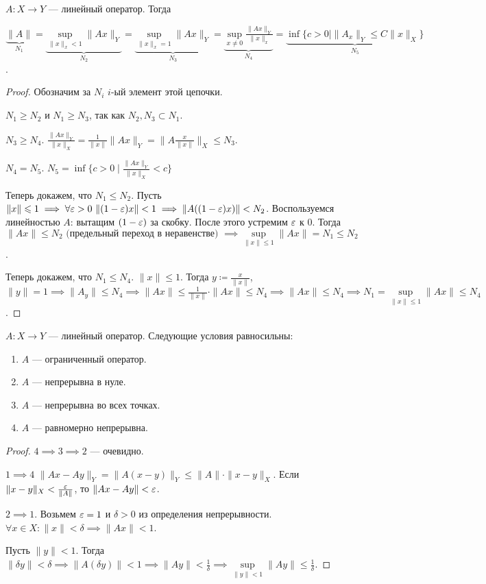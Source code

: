 \begin{theorem}
    $A\!: X \to Y$ --- линейный оператор. Тогда

     $\underbrace{\|A\|}_{N_1} = \underbrace{\sup\limits_{\| x\|_x < 1} \|Ax\|_Y}_{N_2} = \underbrace{\sup\limits_{\| x\|_x = 1} \|Ax\|_Y}_{N_3} = \underbrace{\sup\limits_{x \neq 0} \frac{\|Ax\|_Y}{\|x\|_x}}_{N_4} = \underbrace{\inf\{ c > 0 \mid \|A_x\|_Y \le C \|x\|_X\}}_{N_5}$.
\end{theorem}
\begin{proof}
    Обозначим за $N_i$  $i$-ый элемент этой цепочки. 

     $N_1 \ge N_2$ и $N_1 \ge N_3$,  так как $N_2, N_3 \subset N_1$. 

     $N_3 \ge N_4$. $\frac{\|Ax\|_Y}{\|x\|_X} = \frac{1}{\|x\|}\|Ax\|_Y = \|A \frac{x}{\|x\|}\|_X \le N_3$.

     $N_4 = N_5$. $N_5 = \inf \{ c>0 \mid \frac{\|Ax\|_Y}{\|x\|_X} < c\}$

     Теперь докажем, что $N_1 \le N_2$. Пусть $\| x \| \leqslant 1 \implies \forall \varepsilon > 0\ \| (1-\varepsilon) x \| < 1 \implies \| A((1-\varepsilon)x) \| < N_2$. Воспользуемся линейностью $A$: вытащим  $(1-\varepsilon)$ за скобку. После этого устремим  $\varepsilon$ к 0. Тогда  $\| Ax \| \le N_2\text{ (предельный переход в неравенстве) }\implies \sup\limits_{\| x \| \le 1} \| A x\| = N_1 \le N_2$.

     Теперь докажем, что $N_1 \le N_4$. $\| x \| \le 1$. Тогда $y \coloneqq \frac{x}{\| x \|}$, $\|y\| = 1 \implies \| A_y \| \le N_4 \implies \| Ax \| \le \frac{1}{\|x \|} \cdot \| Ax \| \le N_4 \implies \| Ax \|  \le N_4 \implies N_1 = \sup\limits_{\|x \| \le 1} \|Ax\| \le N_4$.
\end{proof}
\begin{theorem}
   $A\!: X \to Y$ --- линейный оператор. Следующие условия равносильны:
   \begin{enumerate}
       \item $A$ --- ограниченный оператор.
       \item  $A$ --- непрерывна в нуле.
       \item  $A$ --- непрерывна во всех точках.
       \item $A$ --- равномерно непрерывна.
   \end{enumerate}
\end{theorem}
\begin{proof}
    $4 \implies 3 \implies 2$ --- очевидно.

    $1 \implies 4$  $\|Ax - Ay\|_Y = \|A(x-y)\|_Y \le \|A\| \cdot \|x-y\|_X$. Если $\|x-y\|_X < \frac{\varepsilon}{\|A\|}$, то $\|Ax - Ay\| < \varepsilon$.

    $2 \implies 1$. Возьмем  $\varepsilon = 1$ и  $\delta > 0$ из определения непрерывности.  $\forall x \in X\!: \|x \| < \delta \implies \|Ax\| < 1$.

    Пусть $\|y\| < 1$. Тогда  $\|\delta y\| < \delta \implies \|A(\delta y)\| < 1 \implies \|Ay\| < \frac{1}{\delta} \implies \sup\limits_{\| y \| < 1} \| Ay\| \le \frac{1}{\delta}$.
\end{proof}
